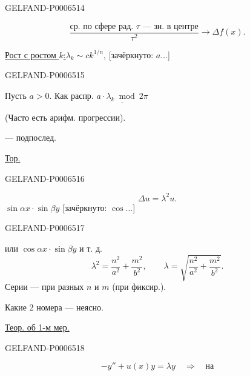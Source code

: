 \begin{GelfandAdjacentEvidence}{GELFAND-P000651}{4}

\[
\frac{\text{ср. по сфере рад. \(\tau\) --- зн. в центре}}{\tau^2}
\longrightarrow\Delta f(x).
\]

\underline{Рост с ростом \(k\):}\quad \(\lambda_k\sim c k^{1/n}\), [зачёркнуто: \(a\ldots\)]
\end{GelfandAdjacentEvidence}
\begin{GelfandAdjacentEvidence}{GELFAND-P000651}{5}


Пусть \(a>0\). Как распр. \(\underline{a\cdot\lambda_k\bmod 2\pi}\)

(Часто есть арифм. прогрессии).

\qquad --- подпослед.

\underline{Тор.}
\end{GelfandAdjacentEvidence}
\begin{GelfandAdjacentEvidence}{GELFAND-P000651}{6}

\[
\Delta u=\lambda^2u.
\]
\(\sin\alpha x\cdot\sin\beta y\)
[зачёркнуто: \(\cos\ldots\)]
\end{GelfandAdjacentEvidence}
\begin{GelfandAdjacentEvidence}{GELFAND-P000651}{7}

или \(\cos\alpha x\cdot\sin\beta y\) и т. д.
\[
\lambda^2=\frac{n^2}{a^2}+\frac{m^2}{b^2},\qquad
\lambda=\sqrt{\frac{n^2}{a^2}+\frac{m^2}{b^2}}.
\]
Серии --- при разных \(n\) и \(m\) (при фиксир.).

Какие 2 номера --- неясно.

\underline{Теор. об 1-м мер.}
\end{GelfandAdjacentEvidence}
\begin{GelfandAdjacentEvidence}{GELFAND-P000651}{8}

\[
-y''+u(x)y=\lambda y\quad\Longrightarrow\quad\text{на}
\]
\end{GelfandAdjacentEvidence}
